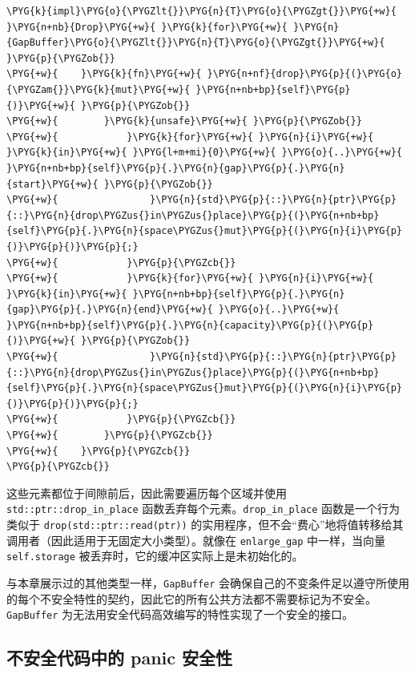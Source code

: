 \begin{Verbatim}[commandchars=\\\{\},breaklines=true,breakanywhere=true,fontsize=\codefont,xleftmargin=17bp]
\PYG{k}{impl}\PYG{o}{\PYGZlt{}}\PYG{n}{T}\PYG{o}{\PYGZgt{}}\PYG{+w}{ }\PYG{n+nb}{Drop}\PYG{+w}{ }\PYG{k}{for}\PYG{+w}{ }\PYG{n}{GapBuffer}\PYG{o}{\PYGZlt{}}\PYG{n}{T}\PYG{o}{\PYGZgt{}}\PYG{+w}{ }\PYG{p}{\PYGZob{}}
\PYG{+w}{    }\PYG{k}{fn}\PYG{+w}{ }\PYG{n+nf}{drop}\PYG{p}{(}\PYG{o}{\PYGZam{}}\PYG{k}{mut}\PYG{+w}{ }\PYG{n+nb+bp}{self}\PYG{p}{)}\PYG{+w}{ }\PYG{p}{\PYGZob{}}
\PYG{+w}{        }\PYG{k}{unsafe}\PYG{+w}{ }\PYG{p}{\PYGZob{}}
\PYG{+w}{            }\PYG{k}{for}\PYG{+w}{ }\PYG{n}{i}\PYG{+w}{ }\PYG{k}{in}\PYG{+w}{ }\PYG{l+m+mi}{0}\PYG{+w}{ }\PYG{o}{..}\PYG{+w}{ }\PYG{n+nb+bp}{self}\PYG{p}{.}\PYG{n}{gap}\PYG{p}{.}\PYG{n}{start}\PYG{+w}{ }\PYG{p}{\PYGZob{}}
\PYG{+w}{                }\PYG{n}{std}\PYG{p}{::}\PYG{n}{ptr}\PYG{p}{::}\PYG{n}{drop\PYGZus{}in\PYGZus{}place}\PYG{p}{(}\PYG{n+nb+bp}{self}\PYG{p}{.}\PYG{n}{space\PYGZus{}mut}\PYG{p}{(}\PYG{n}{i}\PYG{p}{)}\PYG{p}{)}\PYG{p}{;}
\PYG{+w}{            }\PYG{p}{\PYGZcb{}}
\PYG{+w}{            }\PYG{k}{for}\PYG{+w}{ }\PYG{n}{i}\PYG{+w}{ }\PYG{k}{in}\PYG{+w}{ }\PYG{n+nb+bp}{self}\PYG{p}{.}\PYG{n}{gap}\PYG{p}{.}\PYG{n}{end}\PYG{+w}{ }\PYG{o}{..}\PYG{+w}{ }\PYG{n+nb+bp}{self}\PYG{p}{.}\PYG{n}{capacity}\PYG{p}{(}\PYG{p}{)}\PYG{+w}{ }\PYG{p}{\PYGZob{}}
\PYG{+w}{                }\PYG{n}{std}\PYG{p}{::}\PYG{n}{ptr}\PYG{p}{::}\PYG{n}{drop\PYGZus{}in\PYGZus{}place}\PYG{p}{(}\PYG{n+nb+bp}{self}\PYG{p}{.}\PYG{n}{space\PYGZus{}mut}\PYG{p}{(}\PYG{n}{i}\PYG{p}{)}\PYG{p}{)}\PYG{p}{;}
\PYG{+w}{            }\PYG{p}{\PYGZcb{}}
\PYG{+w}{        }\PYG{p}{\PYGZcb{}}
\PYG{+w}{    }\PYG{p}{\PYGZcb{}}
\PYG{p}{\PYGZcb{}}
\end{Verbatim}

这些元素都位于间隙前后，因此需要遍历每个区域并使用 \texttt{std::ptr::drop\_in\_place} 函数丢弃每个元素。\texttt{drop\_in\_place} 函数是一个行为类似于 \texttt{drop(std::ptr::read(ptr))} 的实用程序，但不会“费心”地将值转移给其调用者（因此适用于无固定大小类型）。就像在 \texttt{enlarge\_gap} 中一样，当向量 \texttt{self.storage} 被丢弃时，它的缓冲区实际上是未初始化的。

与本章展示过的其他类型一样，\texttt{GapBuffer} 会确保自己的不变条件足以遵守所使用的每个不安全特性的契约，因此它的所有公共方法都不需要标记为不安全。\texttt{GapBuffer} 为无法用安全代码高效编写的特性实现了一个安全的接口。

\subsection{不安全代码中的 panic 安全性}

